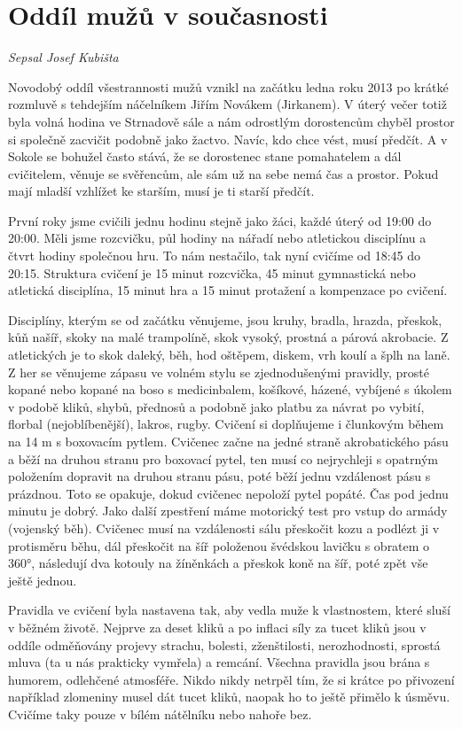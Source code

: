 \section{Oddíl mužů v
současnosti}\label{odduxedl-muux17eux16f-v-souux10dasnosti}

\emph{Sepsal Josef Kubišta}

Novodobý oddíl všestrannosti mužů vznikl na začátku ledna roku 2013 po
krátké rozmluvě s tehdejším náčelníkem Jiřím Novákem (Jirkanem). V úterý
večer totiž byla volná hodina ve Strnadově sále a nám odrostlým
dorostencům chyběl prostor si společně zacvičit podobně jako žactvo.
Navíc, kdo chce vést, musí předčít. A v Sokole se bohužel často stává,
že se dorostenec stane pomahatelem a dál cvičitelem, věnuje se
svěřencům, ale sám už na sebe nemá čas a prostor. Pokud mají mladší
vzhlížet ke starším, musí je ti starší předčít.

První roky jsme cvičili jednu hodinu stejně jako žáci, každé úterý od
19:00 do 20:00. Měli jsme rozcvičku, půl hodiny na nářadí nebo
atletickou disciplínu a čtvrt hodiny společnou hru. To nám nestačilo,
tak nyní cvičíme od 18:45 do 20:15. Struktura cvičení je 15 minut
rozcvička, 45 minut gymnastická nebo atletická disciplína, 15 minut hra
a 15 minut protažení a kompenzace po cvičení.

Disciplíny, kterým se od začátku věnujeme, jsou kruhy, bradla, hrazda,
přeskok, kůň našíř, skoky na malé trampolíně, skok vysoký, prostná a
párová akrobacie. Z atletických je to skok daleký, běh, hod oštěpem,
diskem, vrh koulí a šplh na laně. Z her se věnujeme zápasu ve volném
stylu se zjednodušenými pravidly, prosté kopané nebo kopané na boso s
medicinbalem, košíkové, házené, vybíjené s úkolem v podobě kliků, shybů,
přednosů a podobně jako platbu za návrat po vybití, florbal
(nejoblíbenější), lakros, rugby. Cvičení si doplňujeme i člunkovým během
na 14 m s boxovacím pytlem. Cvičenec začne na jedné straně akrobatického
pásu a běží na druhou stranu pro boxovací pytel, ten musí co nejrychleji
s opatrným položením dopravit na druhou stranu pásu, poté běží jednu
vzdálenost pásu s prázdnou. Toto se opakuje, dokud cvičenec nepoloží
pytel popáté. Čas pod jednu minutu je dobrý. Jako další zpestření máme
motorický test pro vstup do armády (vojenský běh). Cvičenec musí na
vzdálenosti sálu přeskočit kozu a podlézt ji v protisměru běhu, dál
přeskočit na šíř položenou švédskou lavičku s obratem o 360°, následují
dva kotouly na žíněnkách a přeskok koně na šíř, poté zpět vše ještě
jednou.

Pravidla ve cvičení byla nastavena tak, aby vedla muže k vlastnostem,
které sluší v běžném životě. Nejprve za deset kliků a po inflaci síly za
tucet kliků jsou v oddíle odměňovány projevy strachu, bolesti,
zženštilosti, nerozhodnosti, sprostá mluva (ta u nás prakticky vymřela)
a remcání. Všechna pravidla jsou brána s humorem, odlehčené atmosféře.
Nikdo nikdy netrpěl tím, že si krátce po přivození například zlomeniny
musel dát tucet kliků, naopak ho to ještě přimělo k úsměvu. Cvičíme taky
pouze v bílém nátělníku nebo nahoře bez.

